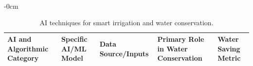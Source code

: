 \documentclass[land,review,accept,pdftex,oneauthor]{Definitions/mdpi}
\begin{document}
\begin{table}[H] 
\caption{AI techniques %
 for smart irrigation and water conservation.}
\label{tab:ai_irrigation} 

\small
\begin{adjustwidth}{-\extralength}{0cm}
\begin{minipage}{\fulllength}
\begin{tabularx}{\textwidth}{m{2.6cm}<{\raggedright}m{3cm}<{\raggedright}m{3.5cm}<{\raggedright}m{4cm}<{\raggedright}m{3.5cm}<{\raggedright}}
\toprule
AI and Algorithmic Category & 
Specific AI/ML Model & 
Data Source/Inputs & 
Primary Role in Water Conservation & 
Water Saving Metric \\
\midrule



\end{tabularx}
\end{minipage}
\end{adjustwidth}
\end{table}
\end{document}
